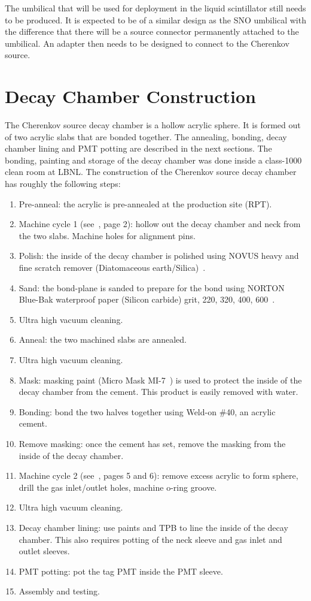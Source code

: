 The umbilical that will be used for deployment in the liquid scintillator still needs to be produced. 
It is expected to be of a similar design as the SNO \Li umbilical with the difference that there will be a source connector permanently attached to the umbilical. 
An adapter then needs to be designed to connect to the Cherenkov source. 

\section{Decay Chamber Construction}
\label{chap:construction}

The Cherenkov source decay chamber is a hollow acrylic sphere.
It is formed out of two acrylic slabs that are bonded together.
The annealing, bonding, decay chamber lining and PMT potting are described in the next sections.
The bonding, painting and storage of the decay chamber was done inside a class-1000 clean room at LBNL.
The construction of the Cherenkov source decay chamber has roughly the following steps:

\begin{enumerate}
\item Pre-anneal: the acrylic is pre-annealed at the production site (RPT).
\item Machine cycle 1 (see~\cite{wallig:2015}, page 2): hollow out the decay chamber and neck from the two slabs. Machine holes for alignment pins. 
\item Polish: the inside of the decay chamber is polished using NOVUS heavy and fine scratch remover (Diatomaceous earth/Silica)~\cite{polish}. 
\item Sand: the bond-plane is sanded to prepare for the bond using NORTON Blue-Bak waterproof paper (Silicon carbide) grit, 220, 320, 400, 600~\cite{sand}.
\item Ultra high vacuum cleaning.
\item Anneal: the two machined slabs are annealed.
\item Ultra high vacuum cleaning.
\item Mask: masking paint (Micro Mask MI-7~\cite{masking}) is used to protect the inside of the decay chamber from the cement. This product is easily removed with water.
\item Bonding: bond the two halves together using Weld-on \#40, an acrylic cement. 
\item Remove masking: once the cement has set, remove the masking from the inside of the decay chamber.
\item Machine cycle 2 (see~\cite{wallig:2015}, pages 5 and 6): remove excess acrylic to form sphere, drill the gas inlet/outlet holes, machine o-ring groove.
\item Ultra high vacuum cleaning.
\item Decay chamber lining: use paints and TPB to line the inside of the decay chamber. This also requires potting of the neck sleeve and gas inlet and outlet sleeves.
\item PMT potting: pot the tag PMT inside the PMT sleeve.
\item Assembly and testing.
\end{enumerate}

